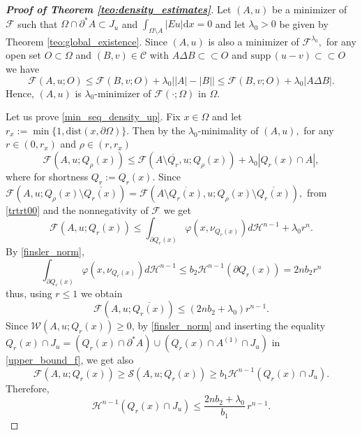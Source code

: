 \documentclass[reqno]{amsart}
\numberwithin{equation}{section}
\theoremstyle{plain}
\theoremstyle{definition}
\newcommand{\cH}{\mathcal{H}}
\newcommand{\cS}{\mathcal{S}}
\newcommand{\cF}{\mathcal{F}}
\newcommand{\cW}{\mathcal{W}}
\newcommand{\p}{\partial}
\newcommand{\cl}[1]{\overline{#1}}
\newcommand{\bound}{b}
\renewcommand{\d}{\mathrm{d}}
\newcommand{\strictlyincluded}{\subset\subset}
\newcommand{\supp}{\mathrm{supp}\,}
\newcommand{\dist}{\mathrm{dist}}
\newcommand{\openset}{O}
\newcommand{\admissible}{\mathcal{C}}
\begin{document}
\begin{proof}[\textbf{Proof of Theorem \ref{teo:density_estimates}}]
%
Let $(A,u)$ be a minimizer of $\cF$  such that $\Omega\cap\p^*A\subset J_u$ and $\int_{\Omega\setminus A}|Eu|\d x=0$ and let $\lambda_0>0$ be given by Theorem \ref{teo:global_existence}.   Since $(A,u)$ is also a minimizer of $\cF^{\lambda_0},$ for any open set $\openset\subset\Omega$ and $(B,v)\in\admissible $ with $A\Delta B\strictlyincluded \openset$ and $\supp(u-v) \strictlyincluded \openset$ we have 
$$
\cF(A,u;\openset) \le \cF(B,v;\openset) + \lambda_0\big||A| - |B|\big| \le \cF(B,v;\openset) + \lambda_0\big|A\Delta B\big|. 
$$
Hence, $(A,u)$ is $\lambda_0$-minimizer of $\cF(\cdot;\Omega)$ in $\Omega.$  
%


Let us prove \eqref{min_seq_density_up}. Fix  $x\in \Omega$ and let $r_x:=\min\{1,\dist(x,\p \Omega)\}.$ Then by the $\lambda_0$-minimality of $(A,u),$
for any $r\in (0,r_x)$ and $\rho\in(r,r_x)$ 
\begin{equation}\label{trtrt00}
\cF(A,u;Q_\rho(x)) \le\cF(A\setminus \cl{Q_r},u;Q_\rho(x)) + \lambda_0|Q_r(x)\cap A|,   
\end{equation} 
where for shortness  $Q_r:=Q_r(x)$.  Since $\cF(A,u;Q_\rho(x)\setminus \cl{Q_r(x)}) = \cF(A\setminus \cl{Q_r(x)},u;Q_\rho(x)\setminus \cl{Q_r(x)}),$ from \eqref{trtrt00} and the  nonnegativity of $\cF$ we get
$$
\cF(A,u; Q_r(x)) \le \int_{\p Q_r(x)} \varphi(x,\nu_{Q_r(x)})d\cH^{n-1}  +  \lambda_0  r^n.
$$
By \eqref{finsler_norm},
$$
\int_{\p Q_r(x)} \varphi(x,\nu_{Q_r(x)})d\cH^{n-1} \le \bound_2\cH^{n-1}(\p Q_r(x)) = 2n\bound_2r^n  
$$
thus, using $r\le1$ we obtain
\begin{equation}\label{upper_bound_f}
\cF(A,u;\overline{Q_r(x)}) \le (2n\bound_2 + \lambda_0)r^{n-1}. 
\end{equation}
Since $\cW(A,u;Q_r(x))\ge0$, by \eqref{finsler_norm} and inserting the equality $Q_r(x)\cap J_u=(Q_r(x)\cap\p^*A)\cup (Q_r(x)\cap A^{(1)}\cap J_u)$ in \eqref{upper_bound_f}, we get also
$$
\cF(A,u;Q_r(x)) \ge \cS(A,u;Q_r(x)) \ge \bound_1\cH^{n-1}(Q_r(x)\cap J_u). 
$$
Therefore, 
$$
\cH^{n-1}(Q_r(x)\cap J_u) \le \frac{2n\bound_2 + \lambda_0}{\bound_1}\,r^{n-1}.
$$


\end{proof}
\end{document}
